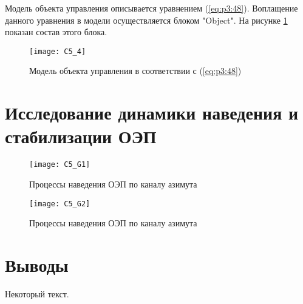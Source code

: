  Модель объекта управления описывается уравнением (\ref{eq:p3:48}). Воплащение данного уравнения в модели осуществляется блоком "Object". На рисунке \ref{fig:object} показан состав этого блока.
\begin{figure}[ht]
	\centering
	\texttt{[image: C5\_4]} 
	\caption{Модель объекта управления в соответствии с (\ref{eq:p3:48})}
	\label{fig:object}
\end{figure}

\newpage

\section{Исследование динамики наведения и стабилизации ОЭП} \label{ch:ch5/sect4}
\begin{figure}[ht]
	\centering
	\texttt{[image: C5\_G1]} 
	\caption{Процессы наведения ОЭП по каналу азимута}
	\label{fig:az_true}
\end{figure}
\begin{figure}[ht]
	\centering
	\texttt{[image: C5\_G2]} 
	\caption{Процессы наведения ОЭП по каналу азимута}
	\label{fig:az_true}
\end{figure}
\section{Выводы} \label{ch:ch5/sect5}
	


Некоторый текст.

\clearpage